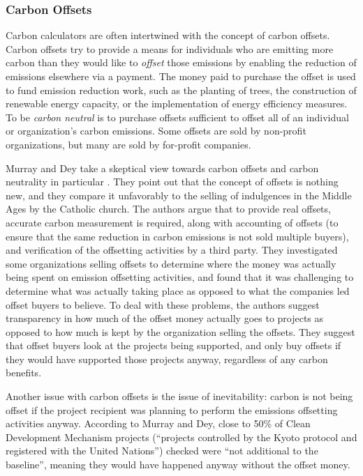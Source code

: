 \subsubsection{Carbon Offsets}

Carbon calculators are often intertwined with the concept of carbon offsets. Carbon offsets try to provide a means for individuals who are emitting more carbon than they would like to \emph{offset} those emissions by enabling the reduction of emissions elsewhere via a payment. The money paid to purchase the offset is used to fund emission reduction work, such as the planting of trees, the construction of renewable energy capacity, or the implementation of energy efficiency measures. To be \emph{carbon neutral} is to purchase offsets sufficient to offset all of an individual or organization's carbon emissions. Some offsets are sold by non-profit organizations, but many are sold by for-profit companies.

Murray and Dey take a skeptical view towards carbon offsets and carbon neutrality in particular \cite{Murray2007Carbon-neutral}. They point out that the concept of offsets is nothing new, and they compare it unfavorably to the selling of indulgences in the Middle Ages by the Catholic church. The authors argue that to provide real offsets, accurate carbon measurement is required, along with accounting of offsets (to ensure that the same reduction in carbon emissions is not sold multiple buyers), and verification of the offsetting activities by a third party. They investigated some organizations selling offsets to determine where the money was actually being spent on emission offsetting activities, and found that it was challenging to determine what was actually taking place as opposed to what the companies led offset buyers to believe. To deal with these problems, the authors suggest transparency in how much of the offset money actually goes to projects as opposed to how much is kept by the organization selling the offsets. They suggest that offset buyers look at the projects being supported, and only buy offsets if they would have supported those projects anyway, regardless of any carbon benefits.

Another issue with carbon offsets is the issue of inevitability: carbon is not being offset if the project recipient was planning to perform the emissions offsetting activities anyway. According to Murray and Dey, close to 50\% of Clean Development Mechanism projects (``projects controlled by the Kyoto protocol and registered with the United Nations'') checked were ``not additional to the baseline'', meaning they would have happened anyway without the offset money.

